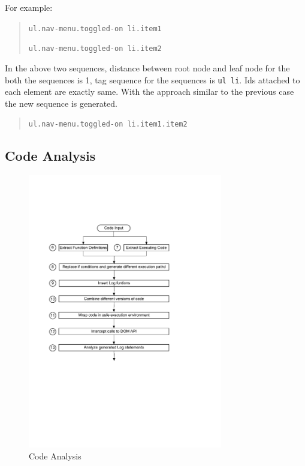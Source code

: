 \begin{description}
			For example:
			\begin{quote}
				\texttt{ul.nav-menu.toggled-on li.item1}
	
				\texttt{ul.nav-menu.toggled-on li.item2}
			\end{quote}

			In the above two sequences, distance between root node and leaf node for the both the sequences is 1, tag sequence for the sequences is \texttt{ul li}. Ids attached to each element are exactly same. With the approach similar to the previous case the new sequence is generated.

			\begin{quote}
				\texttt{ul.nav-menu.toggled-on li.item1.item2}
			\end{quote}
		
		\end{description}
	
	\subsection{Code Analysis}
	\label{Sec:Code-Analysis}
		\begin{figure}
			\centering
			\includegraphics[width=85mm]{images/code_analysis.pdf}
			\caption{Code Analysis}
			\label{Fig:Code-Analysis}
		\end{figure}
	
